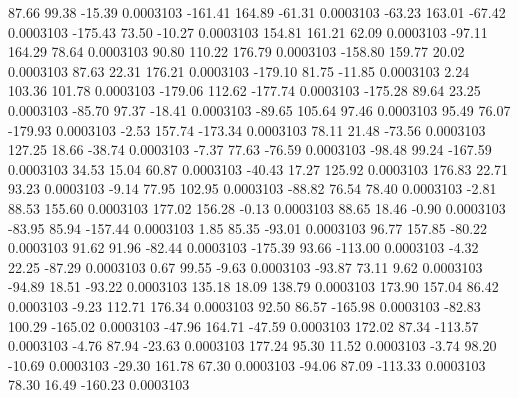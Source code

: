        87.66       99.38      -15.39     0.0003103
     -161.41      164.89      -61.31     0.0003103
      -63.23      163.01      -67.42     0.0003103
     -175.43       73.50      -10.27     0.0003103
      154.81      161.21       62.09     0.0003103
      -97.11      164.29       78.64     0.0003103
       90.80      110.22      176.79     0.0003103
     -158.80      159.77       20.02     0.0003103
       87.63       22.31      176.21     0.0003103
     -179.10       81.75      -11.85     0.0003103
        2.24      103.36      101.78     0.0003103
     -179.06      112.62     -177.74     0.0003103
     -175.28       89.64       23.25     0.0003103
      -85.70       97.37      -18.41     0.0003103
      -89.65      105.64       97.46     0.0003103
       95.49       76.07     -179.93     0.0003103
       -2.53      157.74     -173.34     0.0003103
       78.11       21.48      -73.56     0.0003103
      127.25       18.66      -38.74     0.0003103
       -7.37       77.63      -76.59     0.0003103
      -98.48       99.24     -167.59     0.0003103
       34.53       15.04       60.87     0.0003103
      -40.43       17.27      125.92     0.0003103
      176.83       22.71       93.23     0.0003103
       -9.14       77.95      102.95     0.0003103
      -88.82       76.54       78.40     0.0003103
       -2.81       88.53      155.60     0.0003103
      177.02      156.28       -0.13     0.0003103
       88.65       18.46       -0.90     0.0003103
      -83.95       85.94     -157.44     0.0003103
        1.85       85.35      -93.01     0.0003103
       96.77      157.85      -80.22     0.0003103
       91.62       91.96      -82.44     0.0003103
     -175.39       93.66     -113.00     0.0003103
       -4.32       22.25      -87.29     0.0003103
        0.67       99.55       -9.63     0.0003103
      -93.87       73.11        9.62     0.0003103
      -94.89       18.51      -93.22     0.0003103
      135.18       18.09      138.79     0.0003103
      173.90      157.04       86.42     0.0003103
       -9.23      112.71      176.34     0.0003103
       92.50       86.57     -165.98     0.0003103
      -82.83      100.29     -165.02     0.0003103
      -47.96      164.71      -47.59     0.0003103
      172.02       87.34     -113.57     0.0003103
       -4.76       87.94      -23.63     0.0003103
      177.24       95.30       11.52     0.0003103
       -3.74       98.20      -10.69     0.0003103
      -29.30      161.78       67.30     0.0003103
      -94.06       87.09     -113.33     0.0003103
       78.30       16.49     -160.23     0.0003103
